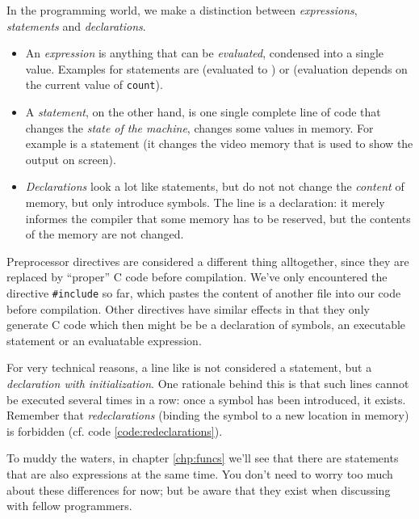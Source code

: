 \begin{hintbox}
In the programming world, we make a distinction between \emph{expressions}, \emph{statements} and \emph{declarations}.

\begin{itemize}
\item An \emph{expression} is anything that can be \emph{evaluated}, \ie condensed into a single value. Examples for statements are  (evaluated to ) 
	or  (evaluation depends on the current value of \texttt{count}).
\item A \emph{statement}, on the other hand, is one single complete line of code that changes the \emph{state of the machine}, \ie changes some values in memory.
	For example  is a statement (it changes the video memory that is used to show the output on screen).
\item \emph{Declarations} look a lot like statements, but do not not change the \emph{content} of memory, but only introduce symbols.
	The line  is a declaration: it merely informes the compiler that some memory has to be reserved, but the contents of the memory are not changed.
\end{itemize}

Preprocessor directives are considered a different thing alltogether, since they are replaced by \enquote{proper} C code before compilation. We've only encountered the directive \texttt{\#include} so far, which pastes the content of another file into our code before compilation. Other directives have similar effects in that they only generate C code which then might be be a declaration of symbols, an executable statement or an evaluatable expression.

For very technical reasons, a line like  is not considered a statement, but a \emph{declaration with initialization}. One rationale behind this is that such lines cannot be executed several times in a row: once a symbol has been introduced, it exists. Remember that \emph{redeclarations} (\ie binding the symbol to a new location in memory) is forbidden (cf. code \ref{code:redeclarations}).

To muddy the waters, in chapter \ref{chp:funcs} we'll see that there are statements that are also expressions at the same time. You don't need to worry too much about these differences for now; but be aware that they exist when discussing with fellow programmers.
\end{hintbox}

